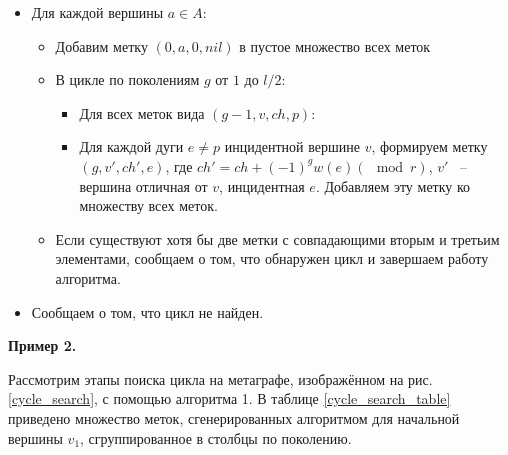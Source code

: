 \documentclass[14pt]{mmcs-article}
\begin{document}
\begin{itemize}

\item Для каждой вершины $a \in A:$

\begin{itemize}
    \item Добавим метку $(0, a, 0, nil)$ в пустое множество всех меток
    \item В цикле по поколениям $g$ от $1$ до $l / 2$:
    \begin{itemize}
        \item Для всех меток вида $(g - 1, v, ch, p)$:
        \item
            Для каждой дуги $e \not= p$ инцидентной вершине $v$,
            формируем метку $(g, v', ch', e)$, где $ch' = ch + (-1)^{g} w(e) (\mod{r})$, $v'$ ~-- вершина отличная от $v$, инцидентная $e$.
            Добавляем эту метку ко множеству всех меток.
    \end{itemize}
    \item Если существуют хотя бы две метки с совпадающими вторым и третьим элементами, сообщаем о том, что обнаружен цикл и завершаем работу алгоритма.
\end{itemize}

\item Сообщаем о том, что цикл не найден.
\end{itemize}

\textbf{Пример 2.}


Рассмотрим этапы поиска цикла на метаграфе, изображённом на рис. \ref{cycle_search}, с помощью алгоритма 1. В таблице \ref{cycle_search_table} приведено множество меток, сгенерированных алгоритмом для начальной вершины $v_1$, сгруппированное в столбцы по поколению.
\end{document}

